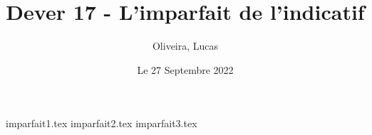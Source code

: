 \documentclass{article}
\title{Dever 17 - L'imparfait de l'indicatif}
\author{Oliveira, Lucas}
\date{Le 27 Septembre 2022}
\begin{document}
    \maketitle

    {imparfait1.tex}
    {imparfait2.tex}
    {imparfait3.tex}
\end{document}

